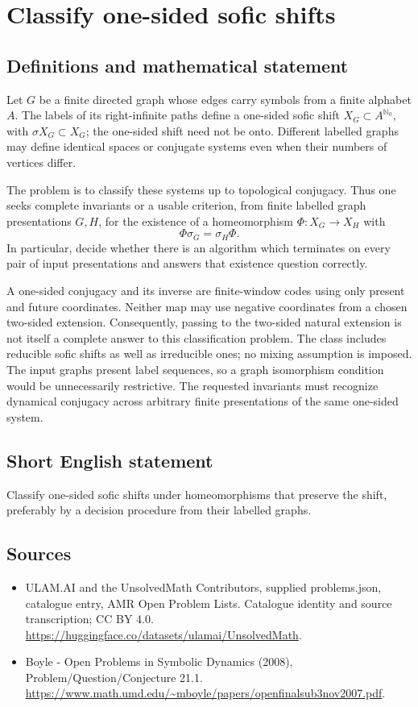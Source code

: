 \documentclass[11pt,a4paper]{article}
\begin{document}
\section*{Classify one-sided sofic shifts}\label{statement}

\subsection{Definitions and mathematical statement}
Let $G$ be a finite directed graph whose edges carry symbols from a
finite alphabet $A$. The labels of its right-infinite paths define a
one-sided sofic shift $X_G\subset A^{\mathbb N_0}$, with
$\sigma X_G\subset X_G$; the one-sided shift need not be onto.
Different labelled graphs may define identical spaces or conjugate
systems even when their numbers of vertices differ.

The problem is to classify these systems up to topological conjugacy.
Thus one seeks complete invariants or a usable criterion, from finite
labelled graph presentations $G,H$, for the existence of a
homeomorphism $\Phi:X_G\to X_H$ with
\[
                     \Phi\sigma_G=\sigma_H\Phi.
\]
In particular, decide whether there is an algorithm which terminates
on every pair of input presentations and answers that existence
question correctly.

A one-sided conjugacy and its inverse are finite-window codes using
only present and future coordinates. Neither map may use negative
coordinates from a chosen two-sided extension. Consequently, passing
to the two-sided natural extension is not itself a complete answer
to this classification problem. The class includes reducible sofic
shifts as well as irreducible ones; no mixing assumption is imposed.
The input graphs present label sequences, so a graph isomorphism
condition would be unnecessarily restrictive. The requested invariants
must recognize dynamical conjugacy across arbitrary finite
presentations of the same one-sided system.
\subsection{Short English statement}
Classify one-sided sofic shifts under homeomorphisms that preserve the shift, preferably by a decision procedure from their labelled graphs.
\subsection{Sources}
\begin{itemize}
\item[S1] ULAM.AI and the UnsolvedMath Contributors, supplied problems.json, catalogue entry, AMR Open Problem Lists. Catalogue identity and source transcription; CC BY 4.0.
\url{https://huggingface.co/datasets/ulamai/UnsolvedMath}.
\item[S2] Boyle - Open Problems in Symbolic Dynamics (2008), Problem/Question/Conjecture 21.1. 
\url{https://www.math.umd.edu/~mboyle/papers/openfinalsub3nov2007.pdf}.
\end{itemize}
\end{document}

